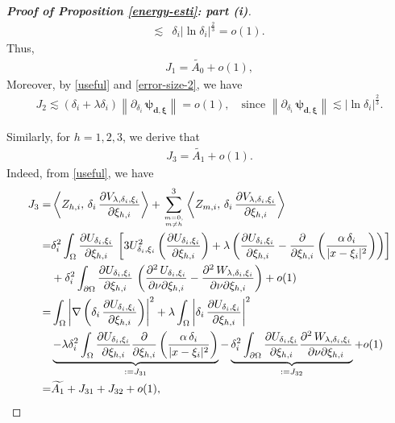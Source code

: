 \documentclass[a4paper,reqno,11pt,oneside]{amsart}
\numberwithin{equation}{section}
\begin{document}
\begin{proof}[\textbf{Proof of Proposition \eqref{energy-esti}: part (i)}]
\begin{align*}
    \lesssim&\delta_i|\ln{\delta_i}|^{\frac{2}{3}}=o(1).
\end{align*}
Thus,
\begin{align}
\label{second-0}J_{1}=\widetilde{A_0}+o(1),
\end{align}
Moreover, by \eqref{useful} and \eqref{error-size-2}, we have
\begin{align}\label{j-2}
    J_{2}\lesssim\left(\delta_i+\lambda\delta_i\right)\left\|\partial_{\delta_i}\,\bm{\psi}_{{{\bm{d},\bm{\xi}}}}\right\|=o(1),\quad\text{since $\left\|\partial_{\delta_i}\,\bm{\psi}_{{{\bm{d},\bm{\xi}}}}\right\|\lesssim|\ln{\delta_i}|^{\frac{2}{3}}$.}
\end{align}

\vspace{0.2cm}
Similarly, for $h=1,2,3$, we derive that
\begin{align}
    \label{second-h}J_{3}=\widetilde{A_1}+o(1).
\end{align}
Indeed, from \eqref{useful}, we have
\begin{align*}
   J_{3}=&\left\langle Z_{h,i},\,\delta_i\,\frac{\partial V_{\lambda,\delta_i,\xi_i}}{\partial\xi_{h,i}}\right\rangle+\sum_{m=0,\atop m\neq h}^3\left\langle Z_{m,i},\,\delta_i\,\frac{\partial V_{\lambda,\delta_i,\xi_i}}{\partial\xi_{h,i}}\right\rangle\\=&\delta_i^2\displaystyle\int_{\Omega}\frac{\partial U_{\delta_i,\xi_i}}{\partial\xi_{h,i}}\, \left[3U^{2}_{ {\delta_i}, {\xi_i}}\left(\frac{\partial U_{\delta_i,\xi_i}}{\partial \xi_{h,i}} \right)+\lambda\left(\frac{\partial U_{\delta_i,\xi_i}}{\partial \xi_{h,i}} -\frac{\partial}{\partial \xi_{h,i}}\left(\frac{\alpha\,\delta_i}{|x-\xi_i|^{2}}\right)\right)\right]\\
   &+\delta_i^2\displaystyle\int_{\partial\Omega}\frac{\partial U_{\delta_i,\xi_i} }{\partial\xi_{h,i}}\,\left(\frac{\partial^2\,U_{ {\delta_i}, {\xi_i}}}{\partial{\nu} \partial \xi_{h,i}} -\frac{\partial^2\,W_{\lambda,\delta_i,\xi_i}}{\partial{\nu}\partial \xi_{h,i}}\right)+o(1)\\=&\displaystyle\int_{\Omega}\left|\nabla\left(\delta_i\,\frac{\partial U_{\delta_i,\xi_i}}{\partial \xi_{h,i}}\right)\right|^2+\lambda\displaystyle\int_{\Omega}\left|\delta_i\,\frac{\partial U_{\delta_i,\xi_i}}{\partial \xi_{h,i}}\right|^2\\&\underbrace{-\lambda\delta_i^2\displaystyle\int_{\Omega}\frac{\partial U_{\delta_i,\xi_i}}{\partial \xi_{h,i}}\frac{\partial}{\partial \xi_{h,i}}\left(\frac{\alpha\,\delta_i}{|x-\xi_i|^{2}}\right)}_{:=J_{31}}-\underbrace{\delta_i^2\displaystyle\int_{\partial\Omega}\frac{\partial U_{\delta_i,\xi_i}}{\partial \xi_{h,i}}\frac{\partial^2\,W_{\lambda,\delta_i,\xi_i}}{\partial{\nu}\partial \xi_{h,i}}}_{:=J_{32}}+o(1)\\=& \widetilde{A_1}+J_{31}+J_{32}+o(1),

\end{align*}
\end{proof}
\end{document}

